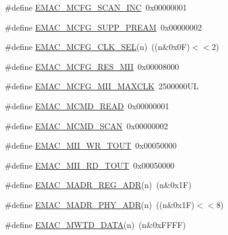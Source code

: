 \begin{DoxyCompactItemize}
\item 
\#define \hyperlink{group___e_m_a_c___private___macros_ga7e7a6dd010ea69d1ccd69bd821669291}{\-E\-M\-A\-C\-\_\-\-M\-C\-F\-G\-\_\-\-S\-C\-A\-N\-\_\-\-I\-N\-C}~0x00000001
\item 
\#define \hyperlink{group___e_m_a_c___private___macros_gaee41a7636ce7048d57ad112c44a2fc90}{\-E\-M\-A\-C\-\_\-\-M\-C\-F\-G\-\_\-\-S\-U\-P\-P\-\_\-\-P\-R\-E\-A\-M}~0x00000002
\item 
\#define \hyperlink{group___e_m_a_c___private___macros_ga3c0c679cb21583b8a4bfa618c82fd3ee}{\-E\-M\-A\-C\-\_\-\-M\-C\-F\-G\-\_\-\-C\-L\-K\-\_\-\-S\-E\-L}(n)~((n\&0x0\-F)$<$$<$2)
\item 
\#define \hyperlink{group___e_m_a_c___private___macros_ga8a00b82c56540cfd9feac11da02f3bf1}{\-E\-M\-A\-C\-\_\-\-M\-C\-F\-G\-\_\-\-R\-E\-S\-\_\-\-M\-I\-I}~0x00008000
\item 
\#define \hyperlink{group___e_m_a_c___private___macros_gaf283db0059cdb43495fd871223a31323}{\-E\-M\-A\-C\-\_\-\-M\-C\-F\-G\-\_\-\-M\-I\-I\-\_\-\-M\-A\-X\-C\-L\-K}~2500000\-U\-L
\item 
\#define \hyperlink{group___e_m_a_c___private___macros_ga4488dce71c84fa1bc9a1829e7e065ced}{\-E\-M\-A\-C\-\_\-\-M\-C\-M\-D\-\_\-\-R\-E\-A\-D}~0x00000001
\item 
\#define \hyperlink{group___e_m_a_c___private___macros_gadb0b31f4f96fbe3bae9d8721eaab3f55}{\-E\-M\-A\-C\-\_\-\-M\-C\-M\-D\-\_\-\-S\-C\-A\-N}~0x00000002
\item 
\#define \hyperlink{group___e_m_a_c___private___macros_gaecb5a0f1eb96c76f0314b0d8f20d6c30}{\-E\-M\-A\-C\-\_\-\-M\-I\-I\-\_\-\-W\-R\-\_\-\-T\-O\-U\-T}~0x00050000
\item 
\#define \hyperlink{group___e_m_a_c___private___macros_gab95b67a347ee27ee42cb90087a01d7e6}{\-E\-M\-A\-C\-\_\-\-M\-I\-I\-\_\-\-R\-D\-\_\-\-T\-O\-U\-T}~0x00050000
\item 
\#define \hyperlink{group___e_m_a_c___private___macros_ga4b4a39abd6a9af038d5e54e5cf0bd299}{\-E\-M\-A\-C\-\_\-\-M\-A\-D\-R\-\_\-\-R\-E\-G\-\_\-\-A\-D\-R}(n)~(n\&0x1\-F)
\item 
\#define \hyperlink{group___e_m_a_c___private___macros_gacec6b8ae2703cab15366f67b784c13b7}{\-E\-M\-A\-C\-\_\-\-M\-A\-D\-R\-\_\-\-P\-H\-Y\-\_\-\-A\-D\-R}(n)~((n\&0x1\-F)$<$$<$8)
\item 
\#define \hyperlink{group___e_m_a_c___private___macros_ga7bd1623acd08aa56a2028aee7788cd1c}{\-E\-M\-A\-C\-\_\-\-M\-W\-T\-D\-\_\-\-D\-A\-T\-A}(n)~(n\&0x\-F\-F\-F\-F)
\item 

\end{DoxyCompactItemize}
